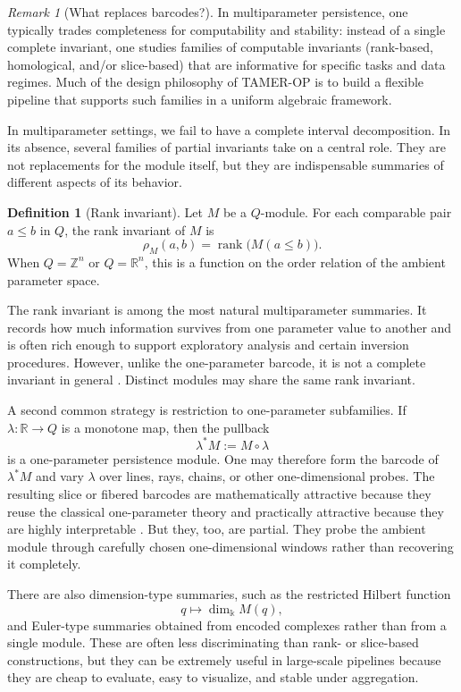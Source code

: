 \documentclass[11pt]{article}
\newcommand{\kk}{\Bbbk}
\theoremstyle{definition}
\newtheorem{defn}[theorem]{Definition}
\theoremstyle{remark}
\newtheorem*{remark}{Remark}
\begin{document}
\begin{remark}[What replaces barcodes?]\label{rmk:what-replaces-barcodes}
	In multiparameter persistence, one typically trades completeness for computability and
	stability: instead of a single complete invariant, one studies families of computable
	invariants (rank-based, homological, and/or slice-based) that are informative for
	specific tasks and data regimes.  Much of the design philosophy of TAMER-OP is to build
	a flexible pipeline that supports such families in a uniform algebraic framework.
\end{remark}

In multiparameter settings, we fail to have a complete interval decomposition. In its absence, several families of partial invariants take on a central role.  They are not replacements for the module itself, but they are indispensable summaries of different aspects of its behavior.

\begin{defn}[Rank invariant]
	Let $M$ be a $Q$-module.  For each comparable pair $a\leq b$ in $Q$, the rank invariant of $M$ is
	\[
	\rho_M(a,b) = \operatorname{rank}\bigl(M(a\leq b)\bigr).
	\]
	When $Q=\mathbb{Z}^n$ or $Q=\mathbb{R}^n$, this is a function on the order relation of the ambient parameter space.
\end{defn}

The rank invariant is among the most natural multiparameter summaries.  It records how much information survives from one parameter value to another and is often rich enough to support exploratory analysis and certain inversion procedures.  However, unlike the one-parameter barcode, it is not a complete invariant in general \cite{CZ09,Les15}.  Distinct modules may share the same rank invariant.

A second common strategy is restriction to one-parameter subfamilies.  If $\lambda\colon \mathbb{R}\to Q$ is a monotone map, then the pullback
\[
\lambda^*M := M\circ \lambda
\]
is a one-parameter persistence module.  One may therefore form the barcode of $\lambda^*M$ and vary $\lambda$ over lines, rays, chains, or other one-dimensional probes.  The resulting slice or fibered barcodes are mathematically attractive because they reuse the classical one-parameter theory and practically attractive because they are highly interpretable \cite{LW15,RIVET}.  But they, too, are partial.  They probe the ambient module through carefully chosen one-dimensional windows rather than recovering it completely.

There are also dimension-type summaries, such as the restricted Hilbert function
\[
q \longmapsto \dim_{\kk} M(q),
\]
and Euler-type summaries obtained from encoded complexes rather than from a single module.  These are often less discriminating than rank- or slice-based constructions, but they can be extremely useful in large-scale pipelines because they are cheap to evaluate, easy to visualize, and stable under aggregation.
\end{document}
